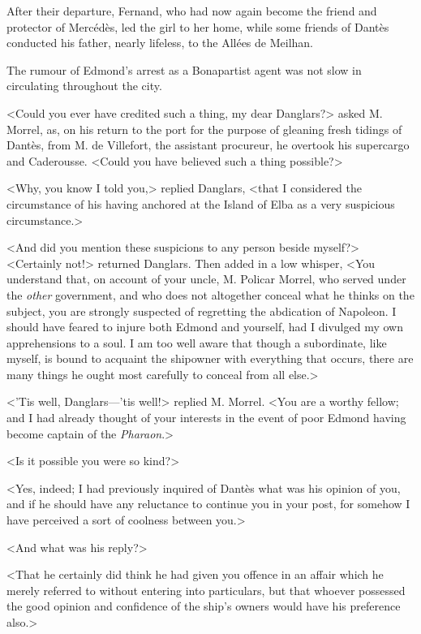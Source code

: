  After their departure, Fernand, who had now again become the friend and protector of Mercédès, led the girl to her home, while some friends of Dantès conducted his father, nearly lifeless, to the Allées de Meilhan. 

 The rumour of Edmond's arrest as a Bonapartist agent was not slow in circulating throughout the city. 

 <Could you ever have credited such a thing, my dear Danglars?> asked M. Morrel, as, on his return to the port for the purpose of gleaning fresh tidings of Dantès, from M. de Villefort, the assistant procureur, he overtook his supercargo and Caderousse. <Could you have believed such a thing possible?> 

 <Why, you know I told you,> replied Danglars, <that I considered the circumstance of his having anchored at the Island of Elba as a very suspicious circumstance.> 

 <And did you mention these suspicions to any person beside myself?>  <Certainly not!> returned Danglars. Then added in a low whisper, <You understand that, on account of your uncle, M. Policar Morrel, who served under the \textit{other} government, and who does not altogether conceal what he thinks on the subject, you are strongly suspected of regretting the abdication of Napoleon. I should have feared to injure both Edmond and yourself, had I divulged my own apprehensions to a soul. I am too well aware that though a subordinate, like myself, is bound to acquaint the shipowner with everything that occurs, there are many things he ought most carefully to conceal from all else.> 

 <'Tis well, Danglars—'tis well!> replied M. Morrel. <You are a worthy fellow; and I had already thought of your interests in the event of poor Edmond having become captain of the \textit{Pharaon}.> 

 <Is it possible you were so kind?> 

 <Yes, indeed; I had previously inquired of Dantès what was his opinion of you, and if he should have any reluctance to continue you in your post, for somehow I have perceived a sort of coolness between you.> 

 <And what was his reply?> 

 <That he certainly did think he had given you offence in an affair which he merely referred to without entering into particulars, but that whoever possessed the good opinion and confidence of the ship's owners would have his preference also.> 

